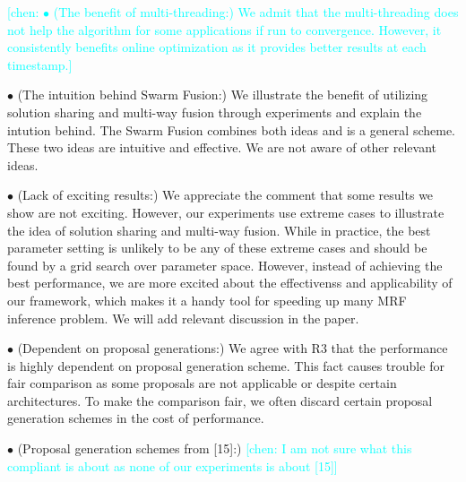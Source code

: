 \documentclass[runningheads]{llncs}
\newcommand{\chen}[1]{\textcolor{cyan}{[chen: {#1}]}}
\begin{document}
\chen{\noindent $\bullet$ (The benefit of multi-threading:)
  We admit that the multi-threading does not help the
  algorithm for some applications if run to
  convergence. However, it consistently benefits online
  optimization as it provides better results at each
  timestamp.}
  
\vspace{0.15cm}

\noindent $\bullet$ (The intuition behind Swarm Fusion:) We
illustrate the benefit of utilizing solution sharing and
multi-way fusion through experiments and explain the
intution behind. The Swarm Fusion combines both ideas and is
a general scheme. These two ideas are intuitive and
effective. We are not aware of other relevant ideas.

\noindent $\bullet$ (Lack of exciting results:) We
appreciate the comment that some results we show are not
exciting. However, our experiments use extreme cases to
illustrate the idea of solution sharing and multi-way
fusion. While in practice, the best parameter setting is
unlikely to be any of these extreme cases and should be
found by a grid search over parameter space. However,
instead of achieving the best performance, we are more
excited about the effectivenss and applicability of our
framework, which makes it a handy tool for speeding up many
MRF inference problem. We will add relevant discussion in
the paper.

\noindent $\bullet$ (Dependent on proposal generations:) We
agree with R3 that the performance is highly dependent on
proposal generation scheme. This fact causes trouble for
fair comparison as some proposals are not applicable or
despite certain architectures. To make the comparison fair,
we often discard certain proposal generation schemes
in the cost of performance.

\noindent $\bullet$ (Proposal generation schemes from [15]:) \chen{I am not sure what this compliant is about as none of our experiments is about [15]}
\end{document}
